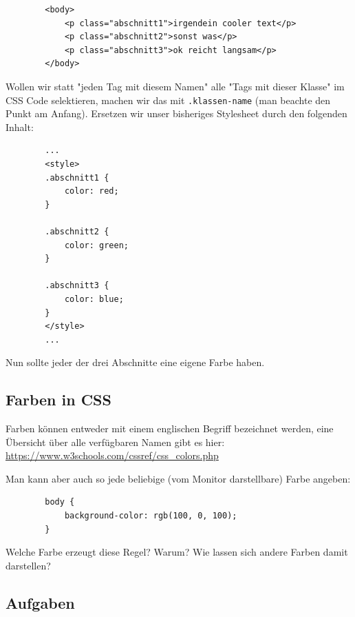 \documentclass[11pt]{article}
\begin{document}
    \begin{verbatim}
        <body>
            <p class="abschnitt1">irgendein cooler text</p>
            <p class="abschnitt2">sonst was</p>
            <p class="abschnitt3">ok reicht langsam</p>
        </body>
    \end{verbatim}

    Wollen wir statt "jeden Tag mit diesem Namen" alle "Tags mit dieser Klasse" im CSS Code selektieren,
    machen wir das mit \Verb".klassen-name" (man beachte den Punkt am Anfang).
    Ersetzen wir unser bisheriges Stylesheet durch den folgenden Inhalt:

    \begin{verbatim}
        ...
        <style>
        .abschnitt1 {
            color: red;
        }

        .abschnitt2 {
            color: green;
        }

        .abschnitt3 {
            color: blue;
        }
        </style>
        ...
    \end{verbatim}

    Nun sollte jeder der drei Abschnitte eine eigene Farbe haben.

    \subsection{Farben in CSS}

    Farben können entweder mit einem englischen Begriff bezeichnet werden, eine Übersicht über alle
    verfügbaren Namen gibt es hier: \url{https://www.w3schools.com/cssref/css_colors.php}

    Man kann aber auch so jede beliebige (vom Monitor darstellbare) Farbe angeben:

    \begin{verbatim}
        body {
            background-color: rgb(100, 0, 100);
        }
    \end{verbatim}

    Welche Farbe erzeugt diese Regel?
    Warum?
    Wie lassen sich andere Farben damit darstellen?

    \newpage

    \subsection{Aufgaben}
\end{document}
